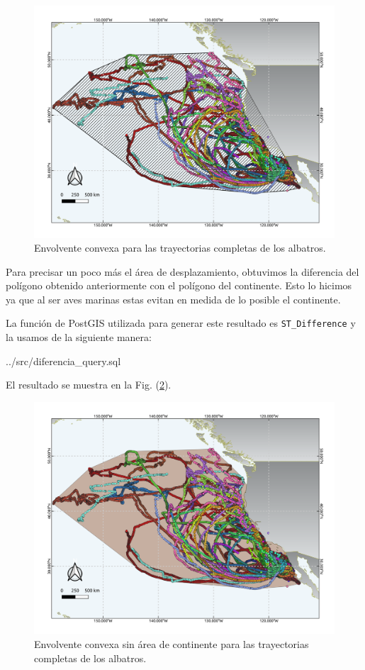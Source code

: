 \begin{figure}[h]
    \centering
    \includegraphics[scale=0.60]{figures/fullConvexHull.png}
    \caption{Envolvente convexa para las trayectorias completas de los albatros.}
    \label{fig:fullConvexHull}
\end{figure}

Para precisar un poco más el área de desplazamiento, obtuvimos la diferencia del
polígono obtenido anteriormente con el polígono del continente. Esto lo hicimos
ya que al ser aves marinas estas evitan en medida de lo posible el continente.

La función de PostGIS utilizada para generar este resultado es
\texttt{ST\_Difference} y la usamos de la siguiente manera:

 {../src/diferencia_query.sql}

El resultado se muestra en la Fig. (\ref{fig:differenceFullConvexHull}).

\begin{figure}[h]
    \centering
    \includegraphics[scale=0.60]{figures/differenceFullConvexHull.png}
    \caption{Envolvente convexa sin área de continente para las trayectorias
    completas de los albatros.}
    \label{fig:differenceFullConvexHull}
\end{figure}


